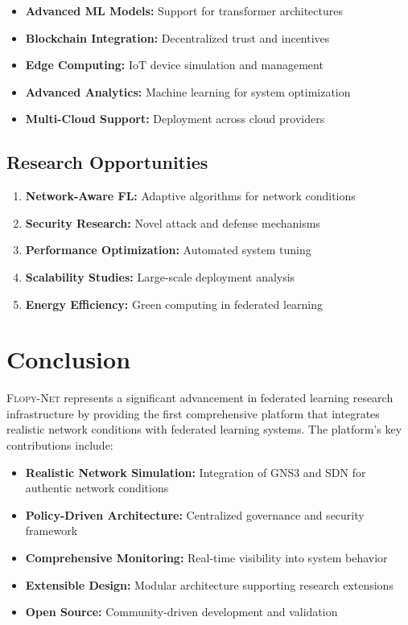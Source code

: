 \documentclass[12pt,a4paper,twoside]{article}
\newcommand{\flopynet}{\textsc{Flopy-Net}}
\begin{document}
\begin{itemize}
    \item \textbf{Advanced ML Models:} Support for transformer architectures
    \item \textbf{Blockchain Integration:} Decentralized trust and incentives
    \item \textbf{Edge Computing:} IoT device simulation and management
    \item \textbf{Advanced Analytics:} Machine learning for system optimization
    \item \textbf{Multi-Cloud Support:} Deployment across cloud providers
\end{itemize}

\subsection{Research Opportunities}

\begin{enumerate}
    \item \textbf{Network-Aware FL:} Adaptive algorithms for network conditions
    \item \textbf{Security Research:} Novel attack and defense mechanisms
    \item \textbf{Performance Optimization:} Automated system tuning
    \item \textbf{Scalability Studies:} Large-scale deployment analysis
    \item \textbf{Energy Efficiency:} Green computing in federated learning
\end{enumerate}

\section{Conclusion}

\flopynet{} represents a significant advancement in federated learning research infrastructure by providing the first comprehensive platform that integrates realistic network conditions with federated learning systems. The platform's key contributions include:

\begin{itemize}
    \item \textbf{Realistic Network Simulation:} Integration of GNS3 and SDN for authentic network conditions
    \item \textbf{Policy-Driven Architecture:} Centralized governance and security framework
    \item \textbf{Comprehensive Monitoring:} Real-time visibility into system behavior
    \item \textbf{Extensible Design:} Modular architecture supporting research extensions
    \item \textbf{Open Source:} Community-driven development and validation
\end{itemize}
\end{document}
